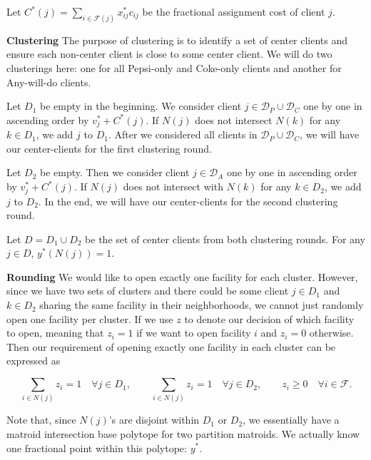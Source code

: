 \noindent
Let $C^*(j) = \sum_{i \in \mathcal{F}(j)} x^*_{ij}c_{ij}$
be the fractional assignment cost of client $j$.

\textbf{Clustering} The purpose of clustering is to identify a set of center clients and ensure each non-center client is close to some center client. We will do two clusterings here: one for all Pepsi-only and Coke-only clients and another
for Any-will-do clients.

Let $D_1$ be empty in the beginning. We consider client $j \in \mathcal{D}_P \cup \mathcal{D}_C$
one by one in ascending order by $v^*_j + C^*(j)$. If $N(j)$ does not intersect $N(k)$
for any $k \in D_1$, we add $j$ to $D_1$. After we considered all clients in $\mathcal{D}_P \cup \mathcal{D}_C$,
we will have our center-clients for the first clustering round.

Let $D_2$ be empty. Then we consider client $j \in \mathcal{D}_A$ one by one
in ascending order by $v^*_j + C^*(j)$.
If $N(j)$ does not intersect with $N(k)$ for any $k \in D_2$, we add $j$ to $D_2$.
In the end, we will have our center-clients for the second clustering round.

\begin{fact}
Let $D = D_1 \cup D_2$ be the set of center clients from both clustering rounds.
For any $j \in D$, $y^*(N(j)) = 1$.
\end{fact}

\textbf{Rounding} We would like to open exactly one facility for each cluster. However, since we have two sets of clusters and there could be some client $j \in D_1$ and $k \in D_2$ sharing the same facility in their neighborhoods, we cannot just randomly open one facility per cluster. If we use $z$ to denote our decision of which facility to open, meaning that $z_i = 1$ if we want to open facility $i$ and $z_i = 0$ otherwise. Then our requirement of opening exactly one facility in each cluster can be expressed as

\[
\sum_{i \in N(j)} z_i = 1 \quad \forall j \in D_1, \qquad %
\sum_{i \in N(j)} z_i = 1 \quad \forall j \in D_2, \qquad %
z_i \ge 0 \quad \forall i \in \mathcal{F}.
\]

Note that, since $N(j)$'s are disjoint within $D_1$ or $D_2$, we essentially have
a matroid intersection base polytope for two partition matroids.
We actually know one fractional point within this polytope: $y^*$.

